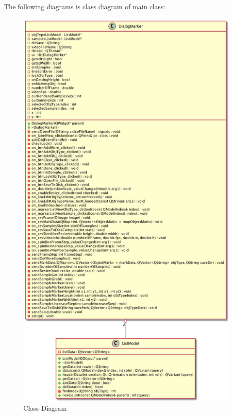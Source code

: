 The following diagrams is class diagram of main class:

\begin{center}
  \begin{figure}[H]
    \centering
    \includegraphics[height=0.9\textheight]{Chapters/Fig/dmarkerd}
    \caption{Class Diagram}
    \label{fig:cd-marker}
  \end{figure}
  \begin{figure}[H]

\end{figure}
\end{center}
